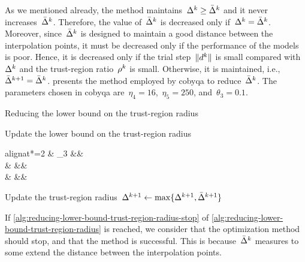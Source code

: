 As we mentioned already, the method maintains~$\rad[k] \ge \radlb[k]$ and it never increases~$\radlb[k]$.
Therefore, the value of~$\radlb[k]$ is decreased only if~$\rad[k] = \radlb[k]$.
Moreover, since~$\radlb[k]$ is designed to maintain a good distance between the interpolation points, it must be decreased only if the performance of the models is poor.
Hence, it is decreased only if the trial step~$\norm{\step[k]}$ is small compared with~$\rad[k]$ and the trust-region ratio~$\ratio[k]$ is small.
Otherwise, it is maintained, i.e.,~$\radlb[k + 1] = \radlb[k]$.
 presents the method employed by \gls{cobyqa} to reduce~$\radlb[k]$.
The parameters chosen in \gls{cobyqa} are~$\eta_4 = 16$,~$\eta_5 = 250$, and~$\theta_3 = 0.1$.

\begin{algorithm}
    \caption{Reducing the lower bound on the trust-region radius}
    \label{alg:reducing-lower-bound-trust-region-radius}
    \DontPrintSemicolon
    \onehalfspacing
    Update the lower bound on the trust-region radius
    \begin{algoempheq}[left={\radlb[k + 1] \gets \empheqlbrace}]{alignat*=2}
        & \theta_3 \radlb[k]                && \quad {}\\
        & \sqrt{\radlb[k] \radlb[\infty]}   && \quad {}\\
        & \radlb[\infty]                    && \quad {}
    \end{algoempheq}
    Update the trust-region radius~$\rad[k + 1] \gets \max \set{\rad[k + 1], \radlb[k + 1]}$\;
\end{algorithm}

If \cref{alg:reducing-lower-bound-trust-region-radius-stop} of \cref{alg:reducing-lower-bound-trust-region-radius} is reached, we consider that the optimization method should stop, and that the method is successful.
This is because~$\radlb[k]$ measures to some extend the distance between the interpolation points.

